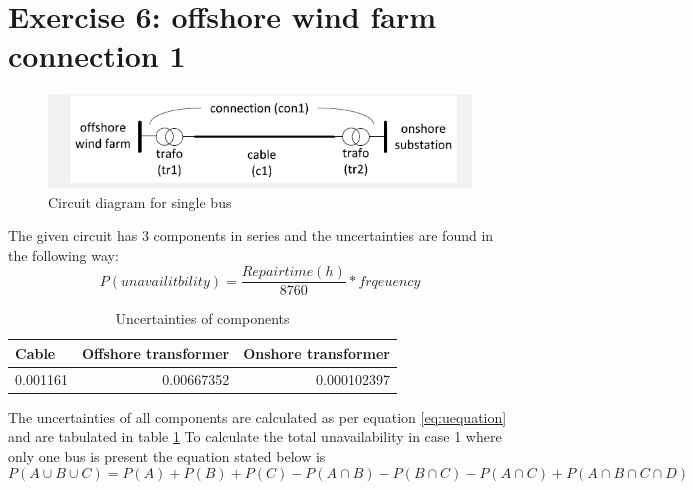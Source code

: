 \section*{\textbf{Exercise 6: offshore wind farm connection 1}}
\begin{figure}[H]
\centering
        \includegraphics[width=0.8 \linewidth]{Q6_circuit1.PNG}
        \caption{Circuit diagram for single bus}
        \label{fig:circuit_label}
    \end{figure}
The given circuit has 3 components in series and the uncertainties are found in the following way:
\begin{equation}
         P(unavailitbility)=\frac{Repair time(h)}{8760}*frqeuency 
         \label{eq:uequation}
     \end{equation}
\begin{table}[htbp]
  \centering
  \caption{Uncertainties of components}
    \begin{tabular}{|r|r|r|}
    \hline
    \multicolumn{1}{|l|}{Cable} & \multicolumn{1}{p{5.415em}|}{Offshore transformer} & \multicolumn{1}{p{5.79em}|}{Onshore transformer} \bigstrut\\
    \hline
    0.001161 & 0.00667352 & 0.000102397 \bigstrut\\
    \hline
    \end{tabular}%
  \label{eq:uncertties}%
\end{table}%
The uncertainties of all components are calculated as per equation \ref{eq:uequation} and are tabulated in table \ref{eq:uncertties}
To calculate the total unavailability in case 1 where only one bus is present the equation stated below is
\begin{equation}
         P(A\cup B \cup C)= P(A)+P(B)+P(C)-P(A\cap B)-P(B\cap C)-P(A\cap C)+P(A \cap B\cap C \cap D)
         
\end{equation}
    
